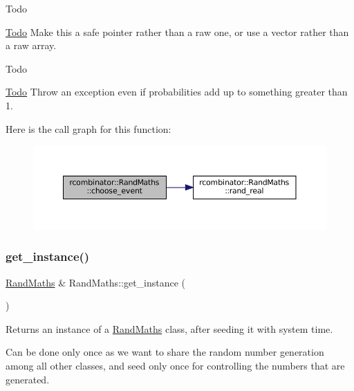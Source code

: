 \begin{DoxyRefDesc}{Todo}
\item[\mbox{\hyperlink{todo__todo000002}{Todo}}]Make this a safe pointer rather than a raw one, or use a vector rather than a raw array.\end{DoxyRefDesc}


\begin{DoxyRefDesc}{Todo}
\item[\mbox{\hyperlink{todo__todo000003}{Todo}}]Throw an exception even if probabilities add up to something greater than 1. \end{DoxyRefDesc}
Here is the call graph for this function\+:\nopagebreak
\begin{figure}[H]
\begin{center}
\leavevmode
\includegraphics[width=350pt]{classrcombinator_1_1RandMaths_afbc0d35bd9744ecab1983914ac32d68c_cgraph}
\end{center}
\end{figure}
\mbox{\label{classrcombinator_1_1RandMaths_ae54dee1a16fb0e275e1624ccaa7dc87e}} 
\subsubsection{\texorpdfstring{get\+\_\+instance()}{get\_instance()}}
{\footnotesize\ttfamily \mbox{\hyperlink{classrcombinator_1_1RandMaths}{Rand\+Maths}} \& Rand\+Maths\+::get\+\_\+instance (\begin{DoxyParamCaption}{ }\end{DoxyParamCaption})\hspace{0.3cm}{\ttfamily [static]}}



Returns an instance of a \mbox{\hyperlink{classrcombinator_1_1RandMaths}{Rand\+Maths}} class, after seeding it with system time. 

Can be done only once as we want to share the random number generation among all other classes, and seed only once for controlling the numbers that are generated. \mbox{\label{classrcombinator_1_1RandMaths_ae417da209eb8a9d1b2217e7a5397926c}} 
